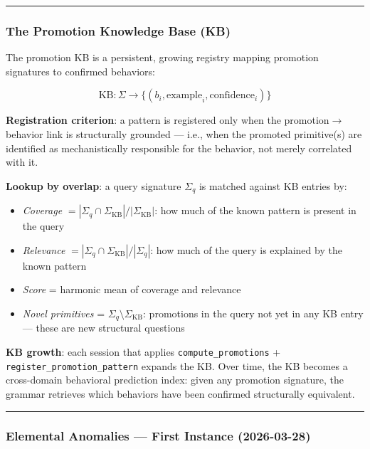 \documentclass[12pt,a4paper]{article}
\begin{document}
\begin{center}
\rule{0.5\textwidth}{0.4pt}
\end{center}

\subsubsection{The Promotion Knowledge Base (KB)}

The promotion KB is a persistent, growing registry mapping promotion signatures to confirmed behaviors:

\[\text{KB}: \Sigma \to \{(b_i, \text{example}_i, \text{confidence}_i)\}\]

\textbf{Registration criterion}: a pattern is registered only when the promotion$\rightarrow$behavior link is structurally grounded --- i.e., when the promoted primitive(s) are identified as mechanistically responsible for the behavior, not merely correlated with it.

\textbf{Lookup by overlap}: a query signature $\Sigma_q$ is matched against KB entries by:

\begin{itemize}
    \item \emph{Coverage} $= |\Sigma_q \cap \Sigma_\text{KB}| / |\Sigma_\text{KB}|$: how much of the known pattern is present in the query
    \item \emph{Relevance} $= |\Sigma_q \cap \Sigma_\text{KB}| / |\Sigma_q|$: how much of the query is explained by the known pattern
    \item \emph{Score} = harmonic mean of coverage and relevance
    \item \emph{Novel primitives} = $\Sigma_q \setminus \Sigma_\text{KB}$: promotions in the query not yet in any KB entry --- these are new structural questions
\end{itemize}

\textbf{KB growth}: each session that applies \texttt{compute\_promotions} + \texttt{register\_promotion\_pattern} expands the KB. Over time, the KB becomes a cross-domain behavioral prediction index: given any promotion signature, the grammar retrieves which behaviors have been confirmed structurally equivalent.

\begin{center}
\rule{0.5\textwidth}{0.4pt}
\end{center}

\subsubsection{Elemental Anomalies --- First Instance (2026-03-28)}
\end{document}
